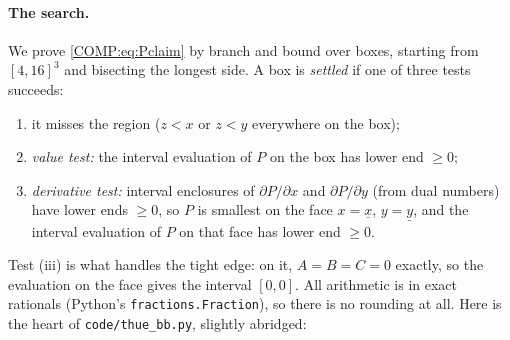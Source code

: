 \paragraph{The search.} We prove \eqref{COMP:eq:Pclaim} by branch and bound over boxes, starting from
$[4,16]^3$ and bisecting the longest side. A box is \emph{settled} if one of three tests succeeds:
\begin{enumerate}[label=(\roman*),nosep]
\item it misses the region ($z<x$ or $z<y$ everywhere on the box);
\item \emph{value test:} the interval evaluation of $P$ on the box has lower end $\ge0$;
\item \emph{derivative test:} interval enclosures of $\partial P/\partial x$ and $\partial P/\partial y$
  (from dual numbers) have lower ends $\ge0$, so $P$ is smallest on the face $x=\underline x$, $y=\underline y$,
  and the interval evaluation of $P$ on that face has lower end $\ge0$.
\end{enumerate}
Test (iii) is what handles the tight edge: on it, $A=B=C=0$ exactly, so the evaluation on the face gives
the interval $[0,0]$. All arithmetic is in exact rationals (Python's
\texttt{fractions.Fraction}), so there is no rounding at all. Here is the heart of
\texttt{code/thue\_bb.py}, slightly abridged:
